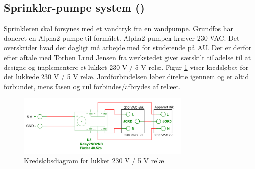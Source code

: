 
\subsection{Sprinkler-pumpe system ()}

Sprinkleren skal forsynes med et vandtryk fra en vandpumpe. Grundfos har doneret en Alpha2 pumpe til formålet. Alpha2 pumpen kræver 230 VAC. Det overskrider hvad der dagligt må arbejde med for studerende på AU. Der er derfor efter aftale med Torben Lund Jensen fra værkstedet givet særskilt tilladelse til at designe og implementere et lukket 230 V / 5 V relæ. Figur \ref{lab:Relay_box} viser kredsløbet for det lukkede 230 V / 5 V relæ. Jordforbindelsen løber direkte igennem og er altid forbundet, mens fasen og nul forbindes/afbrydes af relæet.  

\begin{figure}[H]
  \centering
    \includegraphics[width=0.75\textwidth]{Billeder/230VAC_KREDS}
    \caption{Kredsløbsdiagram for lukket 230 V / 5 V relæ}
    \label{lab:Relay_box}
\end{figure}